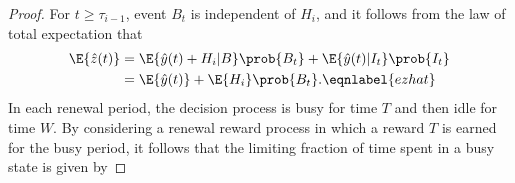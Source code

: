 \documentclass[conference, 10pt]{IEEEtran}
\newcommand{\maxage}{\hat{x}}
\newcommand{\dpage}{\hat{y}}
\newcommand{\monage}{\hat{z}}
\newcommand{\RY}[1]{\quad {\color{red} #1} \quad}
\begin{document}
\begin{proof}
For $t\ge \tau_{i-1}$, event $B_t$ is independent of $H_i$, and it follows from  the law of total expectation that
  \begin{align}
        \E{\monage(t)} &= \E{\dpage(t) +H _i| B}\prob{B_t} + \E{\dpage(t) | I_t} \prob{I_t} \nonumber \\
        &= \E{\dpage(t)} + \E{H_i}\prob{B_t}.
        \eqnlabel{ezhat}
    \end{align}
    In each renewal period, the decision process is busy for time $T$ and then idle for time $W$. By considering a renewal reward process in which a reward  $T$ is earned for the busy period, it follows that the limiting fraction of time spent in a busy state is given by

\end{proof}
\end{document}
